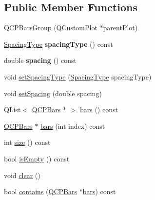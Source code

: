 \subsection*{Public Member Functions}
\begin{DoxyCompactItemize}
\item 
\mbox{\hyperlink{class_q_c_p_bars_group_aa4e043b9a22c6c5ea0f93740aca063e1}{Q\+C\+P\+Bars\+Group}} (\mbox{\hyperlink{class_q_custom_plot}{Q\+Custom\+Plot}} $\ast$parent\+Plot)
\item 
\mbox{\label{class_q_c_p_bars_group_a894a77c45325aad2e742d936bc1f8aea}} 
\mbox{\hyperlink{class_q_c_p_bars_group_a4c0521120a97e60bbca37677a37075b6}{Spacing\+Type}} {\bfseries spacing\+Type} () const
\item 
\mbox{\label{class_q_c_p_bars_group_a314d09aeb2ad209518b9183ca7ffe662}} 
double {\bfseries spacing} () const
\item 
void \mbox{\hyperlink{class_q_c_p_bars_group_a2c7e2d61b10594a4555b615e1fcaf49e}{set\+Spacing\+Type}} (\mbox{\hyperlink{class_q_c_p_bars_group_a4c0521120a97e60bbca37677a37075b6}{Spacing\+Type}} spacing\+Type)
\item 
void \mbox{\hyperlink{class_q_c_p_bars_group_aa553d327479d72a0c3dafcc724a190e2}{set\+Spacing}} (double spacing)
\item 
Q\+List$<$ \mbox{\hyperlink{class_q_c_p_bars}{Q\+C\+P\+Bars}} $\ast$ $>$ \mbox{\hyperlink{class_q_c_p_bars_group_a6e4f4e86abbec6a9342f204ef82abef8}{bars}} () const
\item 
\mbox{\hyperlink{class_q_c_p_bars}{Q\+C\+P\+Bars}} $\ast$ \mbox{\hyperlink{class_q_c_p_bars_group_a0754d659a020aa7fddfe81e657ce2d92}{bars}} (int index) const
\item 
int \mbox{\hyperlink{class_q_c_p_bars_group_a3780ec77919cb00840207ec7a0f00dd5}{size}} () const
\item 
bool \mbox{\hyperlink{class_q_c_p_bars_group_aac959e79e852e8ef9aea6e0449ad000a}{is\+Empty}} () const
\item 
void \mbox{\hyperlink{class_q_c_p_bars_group_a3ddf23928c6cd89530bd34ab7ba7b177}{clear}} ()
\item 
bool \mbox{\hyperlink{class_q_c_p_bars_group_ae26da07a23553052a178fb3fae90d0dc}{contains}} (\mbox{\hyperlink{class_q_c_p_bars}{Q\+C\+P\+Bars}} $\ast$\mbox{\hyperlink{class_q_c_p_bars_group_a6e4f4e86abbec6a9342f204ef82abef8}{bars}}) const
\item 

\end{DoxyCompactItemize}
